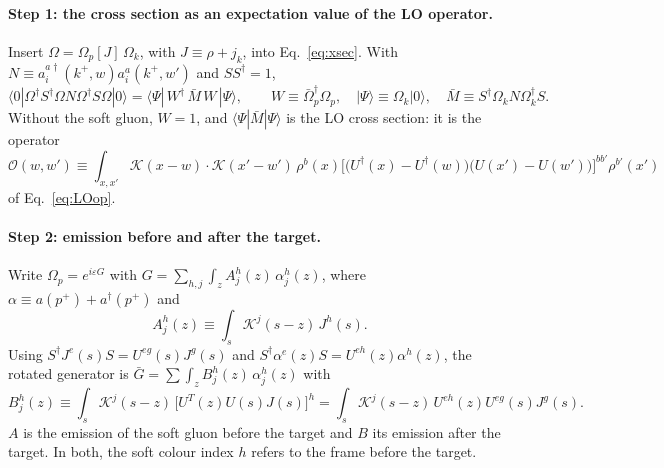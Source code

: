 \documentclass[aps,prd,onecolumn,superscriptaddress,nofootinbib,floatfix,longbibliography,11pt]{revtex4-2}
\numberwithin{equation}{section}
\newcommand{\KK}{\mathcal{K}}
\newcommand{\Ud}{U^{\dagger}}
\newcommand{\Ord}{\mathcal{O}}
\begin{document}
\paragraph*{Step 1: the cross section as an expectation value of the LO operator.} Insert $\Omega=\Omega_p[J]\,\Omega_k$, with $J\equiv\rho+j_k$, into Eq.~\eqref{eq:xsec}. With $N\equiv a^{a\dagger}_i(k^+,w)a^a_i(k^+,w')$ and $SS^\dagger=1$,
\begin{equation}
\langle0|\Omega^\dagger S^\dagger\Omega N\Omega^\dagger S\Omega|0\rangle=\langle\Psi|\,W^\dagger\,\bar M\,W\,|\Psi\rangle,\qquad W\equiv\bar\Omega_p^\dagger\Omega_p,\quad|\Psi\rangle\equiv\Omega_k|0\rangle,\quad\bar M\equiv S^\dagger\Omega_kN\Omega_k^\dagger S.
\label{eq:step1}
\end{equation}
Without the soft gluon, $W=1$, and $\langle\Psi|\bar M|\Psi\rangle$ is the LO cross section: it is the operator
\begin{equation}
\Ord(w,w')\equiv\int_{x,x'}\KK(x-w)\cdot\KK(x'-w')\,\rho^b(x)\Big[\big(\Ud(x)-\Ud(w)\big)\big(U(x')-U(w')\big)\Big]^{bb'}\rho^{b'}(x')
\label{eq:Oop}
\end{equation}
of Eq.~\eqref{eq:LOop}.

\paragraph*{Step 2: emission before and after the target.} Write $\Omega_p=e^{i\varepsilon G}$ with $G=\sum_{h,j}\int_zA^h_j(z)\,\alpha^h_j(z)$, where $\alpha\equiv a(p^+)+a^\dagger(p^+)$ and
\begin{equation}
A^h_j(z)\equiv\int_s\KK^j(s-z)\,J^h(s).
\end{equation}
Using $S^\dagger J^e(s)S=U^{eg}(s)J^g(s)$ and $S^\dagger\alpha^e(z)S=U^{eh}(z)\alpha^h(z)$, the rotated generator is $\bar G=\sum\int_zB^h_j(z)\,\alpha^h_j(z)$ with
\begin{equation}
B^h_j(z)\equiv\int_s\KK^j(s-z)\,\big[U^T(z)U(s)J(s)\big]^h=\int_s\KK^j(s-z)\,U^{eh}(z)U^{eg}(s)J^g(s).
\end{equation}
$A$ is the emission of the soft gluon before the target and $B$ its emission after the target. In both, the soft colour index $h$ refers to the frame before the target.
\end{document}
